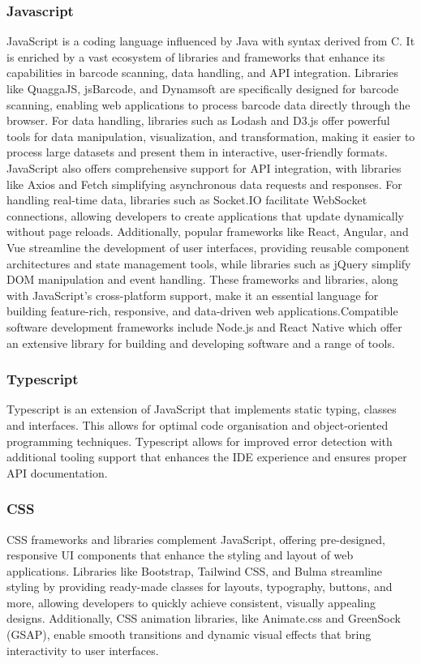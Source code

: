 \documentclass[conference]{IEEEtran}
\begin{document}
\subsubsection{Javascript}
JavaScript is a coding language influenced by Java with syntax derived from C.  
It is enriched by a vast ecosystem of libraries and frameworks that enhance its capabilities in barcode scanning, data handling, and API integration. Libraries like QuaggaJS, jsBarcode, and Dynamsoft are specifically designed for barcode scanning, enabling web applications to process barcode data directly through the browser. For data handling, libraries such as Lodash and D3.js offer powerful tools for data manipulation, visualization, and transformation, making it easier to process large datasets and present them in interactive, user-friendly formats. 
JavaScript also offers comprehensive support for API integration, with libraries like Axios and Fetch simplifying asynchronous data requests and responses. For handling real-time data, libraries such as Socket.IO facilitate WebSocket connections, allowing developers to create applications that update dynamically without page reloads. Additionally, popular frameworks like React, Angular, and Vue streamline the development of user interfaces, providing reusable component architectures and state management tools, while libraries such as jQuery simplify DOM manipulation and event handling. These frameworks and libraries, along with JavaScript’s cross-platform support, make it an essential language for building feature-rich, responsive, and data-driven web applications.Compatible software development frameworks include Node.js and React Native which offer an extensive library for building and developing software and a range of tools.  

\subsubsection{Typescript}
Typescript is an extension of JavaScript that implements static typing, classes and interfaces. This allows for optimal code organisation and object-oriented programming techniques. Typescript allows for improved error detection with additional tooling support that enhances the IDE experience and ensures proper API documentation. 

\subsubsection{CSS}
CSS frameworks and libraries complement JavaScript, offering pre-designed, responsive UI components that enhance the styling and layout of web applications. Libraries like Bootstrap, Tailwind CSS, and Bulma streamline styling by providing ready-made classes for layouts, typography, buttons, and more, allowing developers to quickly achieve consistent, visually appealing designs. Additionally, CSS animation libraries, like Animate.css and GreenSock (GSAP), enable smooth transitions and dynamic visual effects that bring interactivity to user interfaces. 
\end{document}
